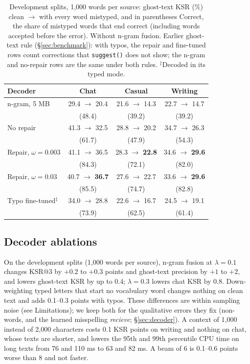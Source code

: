 \documentclass[11pt]{article}
\begin{document}
\begin{table}[t]
\centering
\footnotesize
\setlength{\tabcolsep}{3pt}
\begin{tabular}{@{}lccc@{}}
\toprule
Decoder & Chat & Casual & Writing \\
\midrule
n-gram, 5 MB & 29.4 $\to$ 20.4 & 21.6 $\to$ 14.3 & 22.7 $\to$ 14.7 \\
& (48.4) & (39.2) & (39.2) \\
No repair & 41.3 $\to$ 32.5 & 28.8 $\to$ 20.2 & 34.7 $\to$ 26.3 \\
& (61.7) & (47.9) & (54.3) \\
Repair, $\omega{=}0.003$ & 41.1 $\to$ 36.5 & 28.3 $\to$ \textbf{22.8} & 34.6 $\to$ \textbf{29.6} \\
& (84.3) & (72.1) & (82.0) \\
Repair, $\omega{=}0.03$ & 40.7 $\to$ \textbf{36.7} & 27.6 $\to$ 22.7 & 33.6 $\to$ \textbf{29.6} \\
& (85.5) & (74.7) & (82.8) \\
Typo fine-tuned$^\ddagger$ & 34.0 $\to$ 28.8 & 22.6 $\to$ 16.7 & 24.5 $\to$ 19.1 \\
& (73.9) & (62.5) & (61.4) \\
\bottomrule
\end{tabular}
\caption{Development splits, 1,000 words per source: ghost-text KSR (\%) clean $\to$ with every word mistyped, and in
parentheses Correct, the share of mistyped words that end correct (including words accepted before the error).
Without n-gram fusion. Earlier ghost-text rule (\S\ref{sec:benchmark}): with typos, the repair and fine-tuned rows
count corrections that \texttt{suggest()} does not show; the n-gram and no-repair rows are the same under both
rules. $^\ddagger$Decoded in its typed mode.}
\label{tab:typos}
\end{table}

\subsection{Decoder ablations}
\label{sec:ablations}

On the development splits (1,000 words per source), n-gram fusion at $\lambda = 0.1$ changes KSR@3 by $+0.2$ to
$+0.3$ points and ghost-text precision by $+1$ to $+2$, and lowers ghost-text KSR by up to 0.4; $\lambda = 0.3$ lowers
chat KSR by 0.8. Down-weighting typed letters that start no vocabulary word changes nothing on clean text and adds
0.1--0.3 points with typos. These differences are within sampling noise (see Limitations); we keep both for the
qualitative errors they fix (non-words, and the learned misspelling \textit{recieve}; \S\ref{sec:decoder}). A context
of 1,000 instead of 2,000 characters costs 0.1 KSR points on writing and nothing on chat, whose texts are shorter, and
lowers the 95th and 99th percentile CPU time on long texts from 76 and 110 ms to 63 and 82 ms. A beam of 6 is
0.1--0.6 points worse than 8 and not faster.
\end{document}
